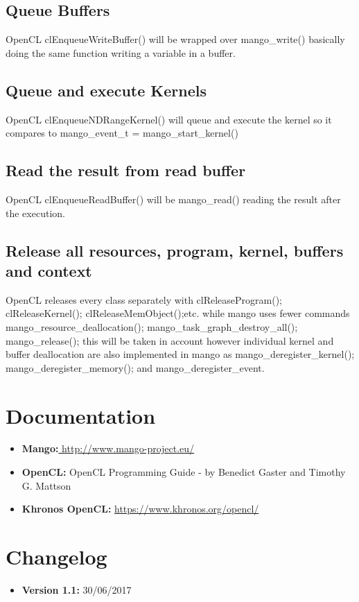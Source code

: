 \documentclass[a4paper]{article}
\begin{document}
\subsection{Queue Buffers}
OpenCL \ttfamily clEnqueueWriteBuffer() \rmfamily will be wrapped over \ttfamily mango\_write() \rmfamily basically doing the same function writing a variable in a buffer.
\subsection{Queue and execute Kernels}
OpenCL \ttfamily clEnqueueNDRangeKernel() \rmfamily will queue and execute the kernel so it compares to \ttfamily mango\_event\_t = mango\_start\_kernel() \rmfamily
\subsection{Read the result from read buffer}
OpenCL \ttfamily clEnqueueReadBuffer() \rmfamily will be \ttfamily mango\_read() \rmfamily reading the result after the execution.
\subsection{Release all resources, program, kernel, buffers and context}
OpenCL releases every class separately with \ttfamily clReleaseProgram(); clReleaseKernel(); clReleaseMemObject();\rmfamily etc. while mango uses fewer commands
\ttfamily mango\_resource\_deallocation(); 
mango\_task\_graph\_destroy\_all(); 
mango\_release(); \rmfamily this will be taken in account however individual kernel and buffer deallocation are also implemented in mango as \ttfamily mango\_deregister\_kernel(); mango\_deregister\_memory(); \rmfamily and \ttfamily mango\_deregister\_event.
\rmfamily

\newpage
\section{Documentation}
\begin{itemize}
	\item \textbf{Mango:}\url{ http://www.mango-project.eu/}
	\item \textbf{OpenCL:} OpenCL Programming Guide - by Benedict Gaster and Timothy G. Mattson
	\item \textbf{Khronos OpenCL:} \url{https://www.khronos.org/opencl/}
\end{itemize}
\newpage


\section{Changelog}
\begin{itemize}
\item \textbf {Version 1.1:} 30/06/2017
\end{itemize}
\end{document}
